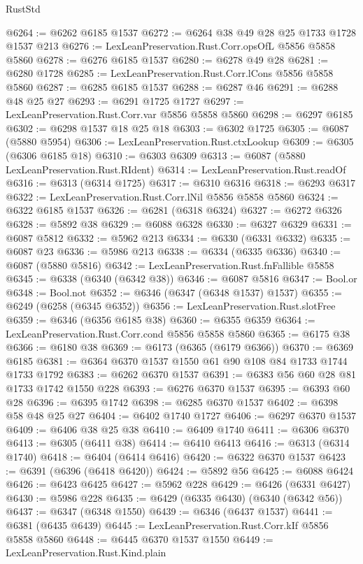 \begin{lexlean}{RustStd}
\begin{coremodule}
@6264 := @6262 @6185 @1537
@6272 := @6264 @38 @49 @28 @25 @1733 @1728 @1537 @213
@6276 := LexLeanPreservation.Rust.Corr.opsOfL @5856 @5858 @5860
@6278 := @6276 @6185 @1537
@6280 := @6278 @49 @28
@6281 := @6280 @1728
@6285 := LexLeanPreservation.Rust.Corr.lCons @5856 @5858 @5860
@6287 := @6285 @6185 @1537
@6288 := @6287 @46
@6291 := @6288 @48 @25 @27
@6293 := @6291 @1725 @1727
@6297 := LexLeanPreservation.Rust.Corr.var @5856 @5858 @5860
@6298 := @6297 @6185
@6302 := @6298 @1537 @18 @25 @18
@6303 := @6302 @1725
@6305 := @6087 (@5880 @5954)
@6306 := LexLeanPreservation.Rust.ctxLookup
@6309 := @6305 (@6306 @6185 @18)
@6310 := @6303 @6309
@6313 := @6087 (@5880 LexLeanPreservation.Rust.RIdent)
@6314 := LexLeanPreservation.Rust.readOf
@6316 := @6313 (@6314 @1725)
@6317 := @6310 @6316
@6318 := @6293 @6317
@6322 := LexLeanPreservation.Rust.Corr.lNil @5856 @5858 @5860
@6324 := @6322 @6185 @1537
@6326 := @6281 (@6318 @6324)
@6327 := @6272 @6326
@6328 := @5892 @38
@6329 := @6088 @6328
@6330 := @6327 @6329
@6331 := @6087 @5812
@6332 := @5962 @213
@6334 := @6330 (@6331 @6332)
@6335 := @6087 @23
@6336 := @5986 @213
@6338 := @6334 (@6335 @6336)
@6340 := @6087 (@5880 @5816)
@6342 := LexLeanPreservation.Rust.fnFallible @5858
@6345 := @6338 (@6340 (@6342 @38))
@6346 := @6087 @5816
@6347 := Bool.or
@6348 := Bool.not
@6352 := @6346 (@6347 (@6348 @1537) @1537)
@6355 := @6249 (@6258 (@6345 @6352))
@6356 := LexLeanPreservation.Rust.slotFree
@6359 := @6346 (@6356 @6185 @38)
@6360 := @6355 @6359
@6364 := LexLeanPreservation.Rust.Corr.cond @5856 @5858 @5860
@6365 := @6175 @38
@6366 := @6180 @38
@6369 := @6173 (@6365 (@6179 @6366))
@6370 := @6369 @6185
@6381 := @6364 @6370 @1537 @1550 @61 @90 @108 @84 @1733 @1744 @1733 @1792
@6383 := @6262 @6370 @1537
@6391 := @6383 @56 @60 @28 @81 @1733 @1742 @1550 @228
@6393 := @6276 @6370 @1537
@6395 := @6393 @60 @28
@6396 := @6395 @1742
@6398 := @6285 @6370 @1537
@6402 := @6398 @58 @48 @25 @27
@6404 := @6402 @1740 @1727
@6406 := @6297 @6370 @1537
@6409 := @6406 @38 @25 @38
@6410 := @6409 @1740
@6411 := @6306 @6370
@6413 := @6305 (@6411 @38)
@6414 := @6410 @6413
@6416 := @6313 (@6314 @1740)
@6418 := @6404 (@6414 @6416)
@6420 := @6322 @6370 @1537
@6423 := @6391 (@6396 (@6418 @6420))
@6424 := @5892 @56
@6425 := @6088 @6424
@6426 := @6423 @6425
@6427 := @5962 @228
@6429 := @6426 (@6331 @6427)
@6430 := @5986 @228
@6435 := @6429 (@6335 @6430) (@6340 (@6342 @56))
@6437 := @6347 (@6348 @1550)
@6439 := @6346 (@6437 @1537)
@6441 := @6381 (@6435 @6439)
@6445 := LexLeanPreservation.Rust.Corr.kIf @5856 @5858 @5860
@6448 := @6445 @6370 @1537 @1550
@6449 := LexLeanPreservation.Rust.Kind.plain

\end{coremodule}
\end{lexlean}
